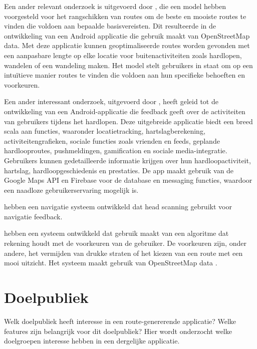      Een ander relevant onderzoek is uitgevoerd door \textcite{Schulze2016}, 
     die een model hebben voorgesteld voor het rangschikken van routes om de beste en mooiste routes te vinden die voldoen aan bepaalde basisvereisten. 
     Dit resulteerde in de ontwikkeling van een Android applicatie die gebruik maakt van OpenStreetMap data. 
     Met deze applicatie kunnen geoptimaliseerde routes worden gevonden met een aanpasbare lengte op elke locatie voor buitenactiviteiten zoals hardlopen, wandelen of een wandeling maken. 
     Het model stelt gebruikers in staat om op een intuïtieve manier routes te vinden die voldoen aan hun specifieke behoeften en voorkeuren.

     Een ander interessant onderzoek, uitgevoerd door \textcite{Adwinda2020}, 
     heeft geleid tot de ontwikkeling van een Android-applicatie die feedback geeft over de activiteiten van gebruikers tijdens het hardlopen. 
     Deze uitgebreide applicatie biedt een breed scala aan functies, waaronder locatietracking, hartslagberekening, activiteitengrafieken, sociale functies zoals vrienden en feeds, 
     geplande hardlooproutes, pushmeldingen, gamification en sociale media-integratie. Gebruikers kunnen gedetailleerde informatie krijgen over hun hardloopactiviteit, hartslag, 
     hardloopgeschiedenis en prestaties. De app maakt gebruik van de Google Maps API en Firebase voor de database en messaging functies, waardoor een naadloze gebruikerservaring mogelijk is.

    \textcite{Gallo2020} hebben een navigatie systeem ontwikkeld dat head scanning gebruikt voor navigatie feedback.

    \textcite{Novack2018} hebben een systeem ontwikkeld dat gebruik maakt van een algoritme dat rekening houdt met de voorkeuren van de gebruiker.
    De voorkeuren zijn, onder andere, het vermijden van drukke straten of het kiezen van een route met een mooi uitzicht.
    Het systeem maakt gebruik van OpenStreetMap data \autocite{Novack2018}.

    \section{Doelpubliek}

    Welk doelpubliek heeft interesse in een route-genererende applicatie? Welke features zijn belangrijk voor dit doelpubliek?
    Hier wordt onderzocht welke doelgroepen interesse hebben in een dergelijke applicatie.

